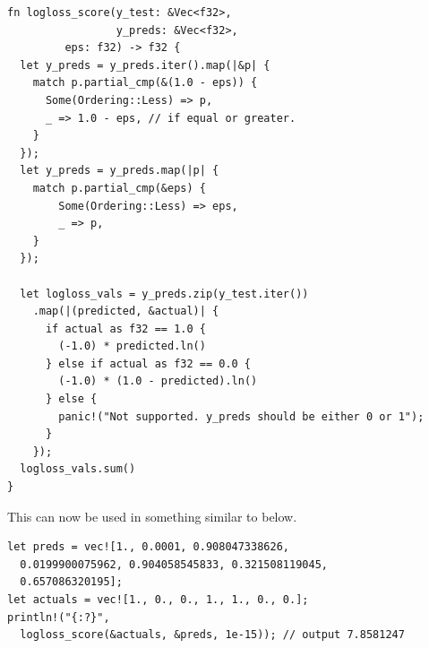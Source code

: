 \documentclass{book}
\begin{document}
\begin{lstlisting}[caption={ml\\-utils\\/src\\/sup\_metrics\\.rs}]
fn logloss_score(y_test: &Vec<f32>,
                 y_preds: &Vec<f32>,
		 eps: f32) -> f32 {
  let y_preds = y_preds.iter().map(|&p| {
    match p.partial_cmp(&(1.0 - eps)) {
      Some(Ordering::Less) => p,
      _ => 1.0 - eps, // if equal or greater.
    }
  });
  let y_preds = y_preds.map(|p| {
    match p.partial_cmp(&eps) {
        Some(Ordering::Less) => eps,
        _ => p,
    }
  });

  let logloss_vals = y_preds.zip(y_test.iter())
    .map(|(predicted, &actual)| {
      if actual as f32 == 1.0 {
        (-1.0) * predicted.ln()
      } else if actual as f32 == 0.0 {
        (-1.0) * (1.0 - predicted).ln()
      } else {
        panic!("Not supported. y_preds should be either 0 or 1");
      }
    });
  logloss_vals.sum()
}
\end{lstlisting}

This can now be used in something similar to below.

\begin{lstlisting}[caption={}]
let preds = vec![1., 0.0001, 0.908047338626,
  0.0199900075962, 0.904058545833, 0.321508119045,
  0.657086320195];
let actuals = vec![1., 0., 0., 1., 1., 0., 0.];
println!("{:?}",
  logloss_score(&actuals, &preds, 1e-15)); // output 7.8581247
\end{lstlisting}
\label{par:logarithmic_loss}

%
%
%
\end{document}
